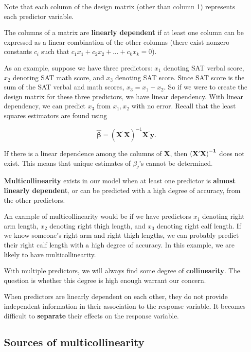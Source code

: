 \documentclass[
]{book}
\begin{document}
Note that each column of the design matrix (other than column 1) represents each predictor variable.

The columns of a matrix are \textbf{linearly dependent} if at least one column can be expressed as a linear combination of the other columns (there exist nonzero constants \(c_i\) such that \(c_1x_1 + c_2x_2 + ... + c_{k}x_{k} = 0\)).

As an example, suppose we have three predictors: \(x_1\) denoting SAT verbal score, \(x_2\) denoting SAT math score, and \(x_3\) denoting SAT score. Since SAT score is the sum of the SAT verbal and math scores, \(x_3 = x_1 + x_2\). So if we were to create the design matrix for these three predictors, we have linear dependency. With linear dependency, we can predict \(x_3\) from \(x_1, x_2\) with no error. Recall that the least squares estimators are found using

\begin{equation}
\boldsymbol{\hat\beta} = \left(\boldsymbol{X}^{\prime} \boldsymbol{X} \right)^{-1} \boldsymbol{X}^{\prime} \boldsymbol{y}.
\label{eq:7ls}
\end{equation}

If there is a linear dependence among the columns of \(\boldsymbol{X}\), then \(\bf{(X^{\prime}X)}^{-1}\) does not exist. This means that unique estimates of \(\beta_j\)'s cannot be determined.

\textbf{Multicollinearity} exists in our model when at least one predictor is \textbf{almost linearly dependent}, or can be predicted with a high degree of accuracy, from the other predictors.

An example of multicollinearity would be if we have predictors \(x_1\) denoting right arm length, \(x_2\) denoting right thigh length, and \(x_3\) denoting right calf length. If we know someone's right arm and right thigh lengths, we can probably predict their right calf length with a high degree of accuracy. In this example, we are likely to have multicollinearity.

With multiple predictors, we will always find some degree of \textbf{collinearity}. The question is whether this degree is high enough warrant our concern.

When predictors are linearly dependent on each other, they do not provide independent information in their association to the response variable. It becomes difficult to \textbf{separate} their effects on the response variable.

\hypertarget{sources}{%
\subsection{Sources of multicollinearity}\label{sources}}
\end{document}
